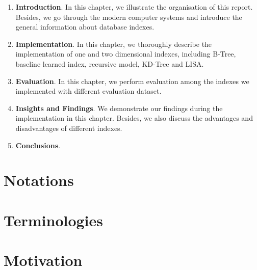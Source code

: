 \begin{enumerate}
	\item \textbf{Introduction}. In this chapter, we illustrate the organisation of this report. Besides, we go through the modern computer systems and introduce the general information about database indexes.
	\item \textbf{Implementation}. In this chapter, we thoroughly describe the implementation of one and two dimensional indexes, including B-Tree, baseline learned index, recursive model, KD-Tree and LISA.
	\item \textbf{Evaluation}. In this chapter, we perform evaluation among the indexes we implemented with different evaluation dataset. 
	\item \textbf{Insights and Findings}. We demonstrate our findings during the implementation in this chapter. Besides, we also discuss the advantages and disadvantages of different indexes.
	\item \textbf{Conclusions}. 
\end{enumerate}

\section{Notations}



\section{Terminologies}



\section{Motivation}




